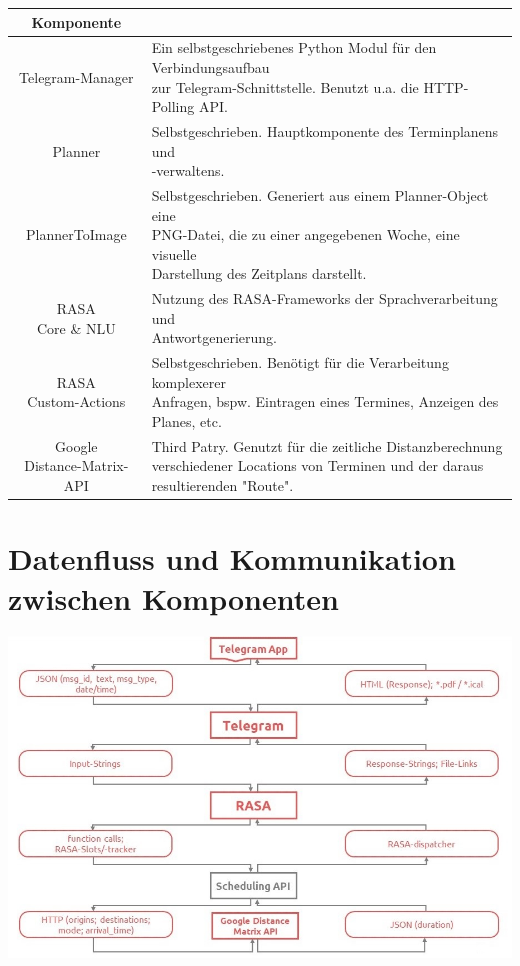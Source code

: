 \begin{center}
	\begin{tabular}{c|l}
		\textbf{Komponente} & \makecell[c]{\textbf{Beschreibung}} \\\hline
		Telegram-Manager & \makecell[l]{Ein selbstgeschriebenes Python Modul für den Verbindungsaufbau\\zur Telegram-Schnittstelle. Benutzt u.a. die HTTP-Polling API.} \\\hline
		Planner & \makecell[l]{Selbstgeschrieben. Hauptkomponente des Terminplanens und\\-verwaltens.} \\\hline
		PlannerToImage & \makecell[l]{Selbstgeschrieben. Generiert aus einem Planner-Object eine\\PNG-Datei, die zu einer angegebenen Woche, eine visuelle\\Darstellung des Zeitplans darstellt.} \\\hline
		\makecell[c]{RASA\\Core \& NLU} & \makecell[l]{Nutzung des RASA-Frameworks der Sprachverarbeitung und\\Antwortgenerierung.}\\\hline
		\makecell[c]{RASA\\Custom-Actions} & \makecell[l]{Selbstgeschrieben. Benötigt für die Verarbeitung komplexerer\\Anfragen, bspw. Eintragen eines Termines, Anzeigen des Planes, etc.}\\\hline
		\makecell[c]{Google\\Distance-Matrix-API} & \makecell[l]{Third Patry. Genutzt für die zeitliche Distanzberechnung\\verschiedener Locations von Terminen und der daraus\\resultierenden "Route".}
	\end{tabular}
\end{center}


\section{Datenfluss und Kommunikation zwischen Komponenten}
\includegraphics[width=\linewidth]{communication}\\


